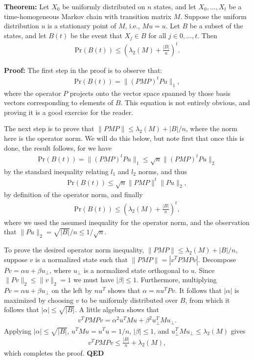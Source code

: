 \documentclass[12pt]{article}
\begin{document}
\textbf{Theorem:} Let $X_0$ be uniformly distributed on $n$ states,
and let $X_0,\ldots,X_t$ be a time-homogeneous Markov chain with
transition matrix $M$.  Suppose the uniform distribution $u$ is a
stationary point of $M$, i.e., $Mu = u$.  Let $B$ be a subset of the
states, and let $B(t)$ be the event that $X_j \in B$ for all $j \in
0,\ldots,t$.  Then
\begin{eqnarray}
  \mbox{Pr}(B(t)) \leq \left( \lambda_2(M) + \frac{|B|}{n}
    \right)^t.
\end{eqnarray}

\textbf{Proof:} The first step in the proof is to observe that:
\begin{eqnarray}
  \mbox{Pr}(B(t)) = \|(PMP)^t P u \|_1,
\end{eqnarray}
where the operator $P$ projects onto the vector space spanned by those
basis vectors corresponding to elements of $B$.  This equation is not
entirely obvious, and proving it is a good exercise for the reader.

The next step is to prove that $\| PMP \| \leq \lambda_2(M)+|B|/n$,
where the norm here is the operator norm.  We will do this below, but
note first that once this is done, the result follows, for we have
\begin{eqnarray}
  \mbox{Pr}(B(t)) = \| (PMP)^t P u \|_1 \leq \sqrt{n} \| (PMP)^t P u \|_2
\end{eqnarray}
by the standard inequality relating $l_1$ and $l_2$ norms, and thus
\begin{eqnarray}
  \mbox{Pr}(B(t)) \leq \sqrt{n} \| PMP \|^t \| P u \|_2,
\end{eqnarray}
by definition of the operator norm, and finally
\begin{eqnarray}
  \mbox{Pr}(B(t)) \leq \left( \lambda_2(M)+\frac{|B|}{n} \right)^t,
\end{eqnarray}
where we used the assumed inequality for the operator norm, and the
observation that $\| P u \|_2 = \sqrt{|B|}/n \leq 1/\sqrt{n}$.

To prove the desired operator norm inequality, $\| PMP \| \leq
\lambda_2(M)+|B|/n$, suppose $v$ is a normalized state such that $\|
PMP \| = |v^T PMP v|$.  Decompose $Pv = \alpha u + \beta u_\perp$,
where $u_\perp$ is a normalized state orthogonal to $u$.  Since $\|P v
\|_2 \leq \|v \|_2 = 1$ we must have $|\beta| \leq 1$.  Furthermore,
multiplying $Pv = \alpha u + \beta u_\perp$ on the left by $nu^T$
shows that $\alpha = n u^T P v$.  It follows that $|\alpha|$ is
maximized by choosing $v$ to be uniformly distributed over $B$, from
which it follows that $|\alpha| \leq \sqrt{|B|}$.  A little algebra
shows that
\begin{eqnarray}
  v^T PMP v =  \alpha^2 u^T M u + \beta^2 u_\perp^T M u_\perp.
\end{eqnarray}
Applying $|\alpha| \leq \sqrt{|B|}$, $u^T M u = u^Tu = 1/n$, $|\beta|
\leq 1$, and $u_\perp^T M u_\perp \leq \lambda_2(M)$ gives
\begin{eqnarray}
  v^T P M P v \leq \frac{|B|}{n} + \lambda_2(M),
\end{eqnarray}
which completes the proof. \textbf{QED}
\end{document}
